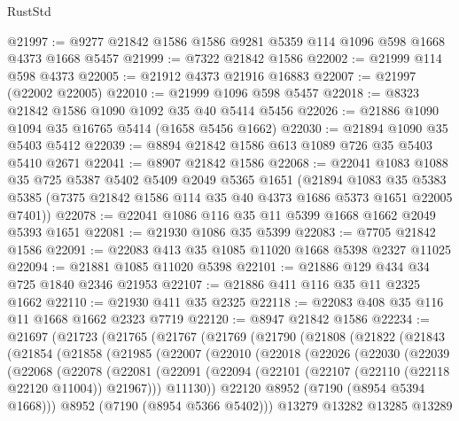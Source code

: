 \begin{lexlean}{RustStd}
\begin{coremodule}
@21997 := @9277 @21842 @1586 @1586 @9281 @5359 @114 @1096 @598 @1668 @4373 @1668 @5457
@21999 := @7322 @21842 @1586
@22002 := @21999 @114 @598 @4373
@22005 := @21912 @4373 @21916 @16883
@22007 := @21997 (@22002 @22005)
@22010 := @21999 @1096 @598 @5457
@22018 := @8323 @21842 @1586 @1090 @1092 @35 @40 @5414 @5456
@22026 := @21886 @1090 @1094 @35 @16765 @5414 (@1658 @5456 @1662)
@22030 := @21894 @1090 @35 @5403 @5412
@22039 := @8894 @21842 @1586 @613 @1089 @726 @35 @5403 @5410 @2671
@22041 := @8907 @21842 @1586
@22068 := @22041
    @1083
    @1088
    @35
    @725
    @5387
    @5402
    @5409
    @2049
    @5365
    @1651
    (@21894
      @1083
      @35
      @5383
      @5385
      (@7375 @21842 @1586 @114 @35 @40 @4373 @1686 @5373 @1651 @22005 @7401))
@22078 := @22041 @1086 @116 @35 @11 @5399 @1668 @1662 @2049 @5393 @1651
@22081 := @21930 @1086 @35 @5399
@22083 := @7705 @21842 @1586
@22091 := @22083 @413 @35 @1085 @11020 @1668 @5398 @2327 @11025
@22094 := @21881 @1085 @11020 @5398
@22101 := @21886 @129 @434 @34 @725 @1840 @2346 @21953
@22107 := @21886 @411 @116 @35 @11 @2325 @1662
@22110 := @21930 @411 @35 @2325
@22118 := @22083 @408 @35 @116 @11 @1668 @1662 @2323 @7719
@22120 := @8947 @21842 @1586
@22234 := @21697
    (@21723
      (@21765
        (@21767
          (@21769
            (@21790
              (@21808
                (@21822
                  (@21843
                    (@21854
                      (@21858
                        (@21985
                          (@22007
                            (@22010
                              (@22018
                                (@22026
                                  (@22030
                                    (@22039
                                      (@22068
                                        (@22078
                                          (@22081
                                            (@22091
                                              (@22094
                                                (@22101
                                                  (@22107 (@22110 (@22118 @22120 @11004)) @21967)))
                                              @11130))
                                          @22120
                                          @8952
                                          (@7190 (@8954 @5394 @1668)))
                                        @8952
                                        (@7190 (@8954 @5366 @5402)))
                                      @13279
                                      @13282
                                      @13285
                                      @13289

\end{coremodule}
\end{lexlean}
